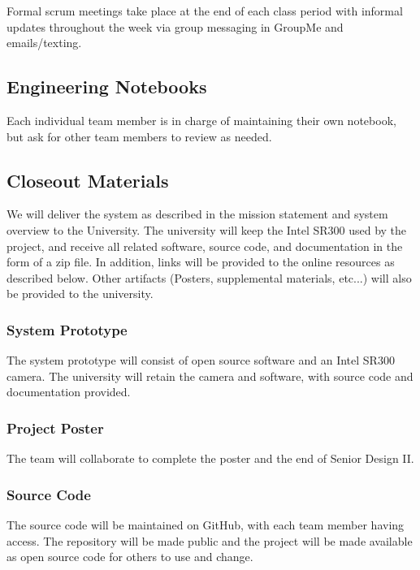 Formal scrum meetings take place at the end of each class period with informal updates throughout the week via group messaging in GroupMe and emails/texting. 

\subsection{Engineering Notebooks}

Each individual team member is in charge of maintaining their own notebook, but ask for other team members to review as needed.

\subsection{Closeout Materials}

We will deliver the system as described in the mission statement and system overview to the University. The university will keep the Intel SR300 used by the project, and receive all related software, source code, and documentation in the form of a zip file. In addition, links will be provided to the online resources as described below. Other artifacts (Posters, supplemental materials, etc...) will also be provided to the university.

\subsubsection{System Prototype}

The system prototype will consist of open source software and an Intel SR300 camera. The university will retain the camera and software, with source code and documentation provided.

\subsubsection{Project Poster}

The team will collaborate to complete the poster and the end of Senior Design II.

\subsubsection{Source Code}

The source code will be maintained on GitHub, with each team member having access. The repository will be made public and the project will be made available as open source code for others to use and change.

